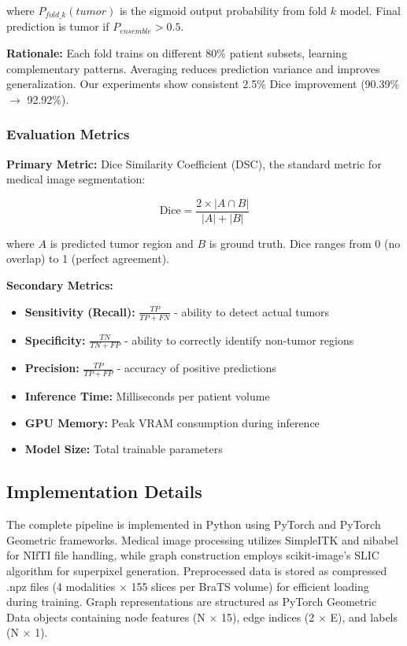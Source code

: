where $P_{fold\_k}(tumor)$ is the sigmoid output probability from fold $k$ model. Final prediction is tumor if $P_{ensemble} > 0.5$.

\textbf{Rationale:} Each fold trains on different 80\% patient subsets, learning complementary patterns. Averaging reduces prediction variance and improves generalization. Our experiments show consistent 2.5\% Dice improvement (90.39\% $\rightarrow$ 92.92\%).

\subsubsection{Evaluation Metrics}

\textbf{Primary Metric:} Dice Similarity Coefficient (DSC), the standard metric for medical image segmentation:

\begin{equation}
\text{Dice} = \frac{2 \times |A \cap B|}{|A| + |B|}
\end{equation}

where $A$ is predicted tumor region and $B$ is ground truth. Dice ranges from 0 (no overlap) to 1 (perfect agreement).

\textbf{Secondary Metrics:}
\begin{itemize}
    \item \textbf{Sensitivity (Recall):} $\frac{TP}{TP + FN}$ - ability to detect actual tumors
    \item \textbf{Specificity:} $\frac{TN}{TN + FP}$ - ability to correctly identify non-tumor regions
    \item \textbf{Precision:} $\frac{TP}{TP + FP}$ - accuracy of positive predictions
    \item \textbf{Inference Time:} Milliseconds per patient volume
    \item \textbf{GPU Memory:} Peak VRAM consumption during inference
    \item \textbf{Model Size:} Total trainable parameters
\end{itemize}


\subsection{Implementation Details}

The complete pipeline is implemented in Python using PyTorch and PyTorch Geometric frameworks. Medical image processing utilizes SimpleITK and nibabel for NIfTI file handling, while graph construction employs scikit-image's SLIC algorithm for superpixel generation. Preprocessed data is stored as compressed .npz files (4 modalities $\times$ 155 slices per BraTS volume) for efficient loading during training. Graph representations are structured as PyTorch Geometric Data objects containing node features (N $\times$ 15), edge indices (2 $\times$ E), and labels (N $\times$ 1).

